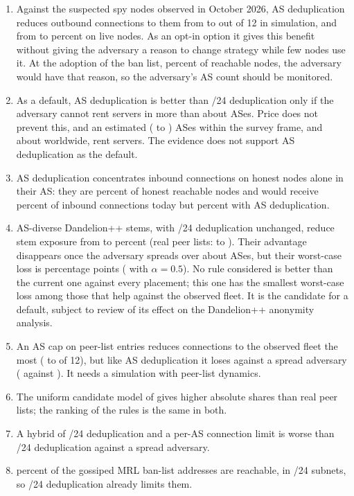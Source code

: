 \documentclass[english]{mrl}
\theoremstyle{plain}
\begin{document}
\begin{enumerate}
\item Against the suspected spy nodes observed in October 2026, AS deduplication reduces outbound connections to them from \simNewSubnetEightyMean{} to \simNewAsmapEightyMean{} out of 12 in simulation, and from \abCtrlPct{} to \abAsmapPct{} percent on live nodes. As an opt-in option it gives this benefit without giving the adversary a reason to change strategy while few nodes use it. At the adoption of the ban list, \banAdoptPct{} percent of reachable nodes, the adversary would have that reason, so the adversary's AS count should be monitored.
\item As a default, AS deduplication is better than /24 deduplication only if the adversary cannot rent servers in more than about \kBreakEven{} ASes. Price does not prevent this, and an estimated \svKR{} (\svKRLoLo{} to \svKRHiHi) ASes within the survey frame, and about \svKGlobalHosting{} worldwide, rent servers. The evidence does not support AS deduplication as the default.
\item AS deduplication concentrates inbound connections on honest nodes alone in their AS: they are \ishAloneNodes{} percent of honest reachable nodes and would receive \ishAloneMaster{} percent of inbound connections today but \ishAloneAsmap{} percent with AS deduplication.
\item AS-diverse Dandelion++ stems, with /24 deduplication unchanged, reduce stem exposure from \stemObsCur{} to \stemObsDiv{} percent (real peer lists: \plStemCurObs{} to \plStemDivObs). Their advantage disappears once the adversary spreads over about \nHonestDcAsn{} ASes, but their worst-case loss is \stemRegretDiv{} percentage points (\stemRegretAlpha{} with $\alpha=0.5$). No rule considered is better than the current one against every placement; this one has the smallest worst-case loss among those that help against the observed fleet. It is the candidate for a default, subject to review of its effect on the Dandelion++ anonymity analysis.
\item An AS cap on peer-list entries reduces connections to the observed fleet the most (\plSubnetObs{} to \plCapThreeObs{} of 12), but like AS deduplication it loses against a spread adversary (\plCapThreeSpr{} against \plSubnetSpr). It needs a simulation with peer-list dynamics.
\item The uniform candidate model of \cite{Rucknium2025} gives higher absolute shares than real peer lists; the ranking of the rules is the same in both.
\item A hybrid of /24 deduplication and a per-AS connection limit is worse than /24 deduplication against a spread adversary.
\item \banReachPct{} percent of the gossiped MRL ban-list addresses are reachable, in \banTwentyFour{} /24 subnets, so /24 deduplication already limits them.
\end{enumerate}
\end{document}
